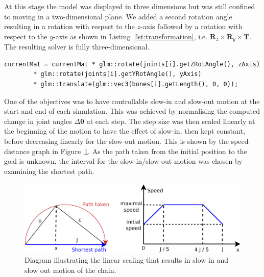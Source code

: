 \documentclass[paper=a4, fontsize=11pt]{scrartcl} %
\numberwithin{equation}{section} %
\numberwithin{figure}{section} %
\numberwithin{table}{section} %
\newcommand{\params}{\boldsymbol{\theta}}
\begin{document}
At this stage the model was displayed in three dimensions but was still confined to moving in a two-dimensional plane. We added a second rotation angle resulting in a rotation with respect to the \(z\)-axis followed by a rotation with respect to the \(y\)-axis as shown in Listing~\ref{lst:transformation}, i.e. \( \mathbf{R}_z \times \mathbf{R}_y \times \mathbf{T}\). The resulting solver is fully three-dimensional. \\


\begin{lstlisting}[float,caption=Update total transformation with current joint rotation and translation., label={lst:transformation}]
currentMat = currentMat * glm::rotate(joints[i].getZRotAngle(), zAxis)
		* glm::rotate(joints[i].getYRotAngle(), yAxis)
		* glm::translate(glm::vec3(bones[i].getLength(), 0, 0));
\end{lstlisting}

One of the objectives was to have controllable slow-in and slow-out motion at the start and end of each simulation. This was achieved by normalising the computed change in joint angles $\Delta \params$ at each step. The step size was then scaled linearly at the beginning of the motion to have the effect of slow-in, then kept constant, before decreasing linearly for the slow-out motion. This is shown by the speed-distance graph in Figure~\ref{fig:scaling}. As the path taken from the initial position to the goal is unknown, the interval for the slow-in/slow-out motion was chosen by examining the shortest path.\\
\begin{figure}[h]
\centering
\includegraphics[scale=0.5]{SpeedDiagram}
\caption{Diagram illustrating the linear scaling that results in slow in and slow out motion of the chain.}
\label{fig:scaling}
\end{figure}

  
\end{document}
